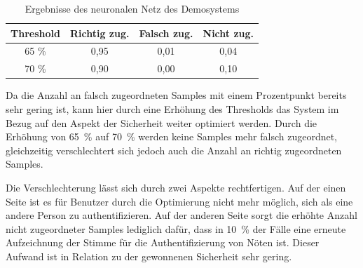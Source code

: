 \begin{table}[H]
    \centering
    \begin{tabular}{c|c|c|c}
        Threshold & Richtig zug. & Falsch zug. & Nicht zug. \\ \hline
        65 \%     & 0,95         & 0,01        & 0,04       \\ \hline
        70 \%     & 0,90         & 0,00        & 0,10       \\ 
    \end{tabular}
    \caption{Ergebnisse des neuronalen Netz des Demosystems}
    \label{table:resultsDemoSystemNN}
\end{table}

Da die Anzahl an falsch zugeordneten Samples mit einem Prozentpunkt bereits sehr gering ist, kann hier durch eine Erhöhung des Thresholds das System im Bezug auf den Aspekt der Sicherheit weiter optimiert werden.
Durch die Erhöhung von 65~\% auf 70~\% werden keine Samples mehr falsch zugeordnet, gleichzeitig verschlechtert sich jedoch auch die Anzahl an richtig zugeordneten Samples.

Die Verschlechterung lässt sich durch zwei Aspekte rechtfertigen.
Auf der einen Seite ist es für Benutzer durch die Optimierung nicht mehr möglich, sich als eine andere Person zu authentifizieren.
Auf der anderen Seite sorgt die erhöhte Anzahl nicht zugeordneter Samples lediglich dafür, dass in 10~\% der Fälle eine erneute Aufzeichnung der Stimme für die Authentifizierung von Nöten ist.
Dieser Aufwand ist in Relation zu der gewonnenen Sicherheit sehr gering.

\textauthor{\vHS}{}{}